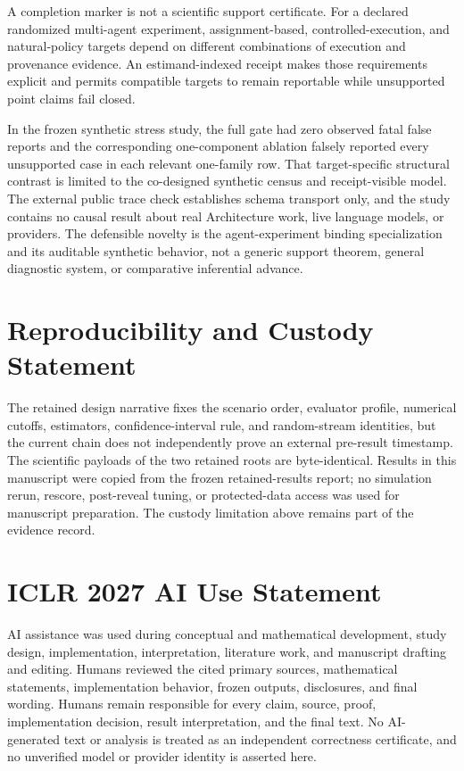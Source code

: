 \documentclass{article}
\begin{document}
A completion marker is not a scientific support certificate. For a declared randomized multi-agent experiment, assignment-based, controlled-execution, and natural-policy targets depend on different combinations of execution and provenance evidence. An estimand-indexed receipt makes those requirements explicit and permits compatible targets to remain reportable while unsupported point claims fail closed.

In the frozen synthetic stress study, the full gate had zero observed fatal false reports and the corresponding one-component ablation falsely reported every unsupported case in each relevant one-family row. That target-specific structural contrast is limited to the co-designed synthetic census and receipt-visible model. The external public trace check establishes schema transport only, and the study contains no causal result about real Architecture work, live language models, or providers. The defensible novelty is the agent-experiment binding specialization and its auditable synthetic behavior, not a generic support theorem, general diagnostic system, or comparative inferential advance.

\section*{Reproducibility and Custody Statement}

The retained design narrative fixes the scenario order, evaluator profile, numerical cutoffs, estimators, confidence-interval rule, and random-stream identities, but the current chain does not independently prove an external pre-result timestamp. The scientific payloads of the two retained roots are byte-identical. Results in this manuscript were copied from the frozen retained-results report; no simulation rerun, rescore, post-reveal tuning, or protected-data access was used for manuscript preparation. The custody limitation above remains part of the evidence record.

\section*{ICLR 2027 AI Use Statement}

AI assistance was used during conceptual and mathematical development, study design, implementation, interpretation, literature work, and manuscript drafting and editing. Humans reviewed the cited primary sources, mathematical statements, implementation behavior, frozen outputs, disclosures, and final wording. Humans remain responsible for every claim, source, proof, implementation decision, result interpretation, and the final text. No AI-generated text or analysis is treated as an independent correctness certificate, and no unverified model or provider identity is asserted here.
\end{document}
